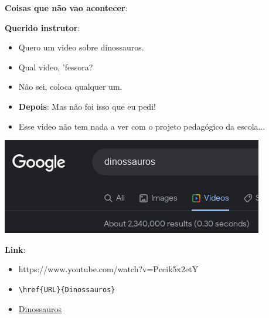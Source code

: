 \begin{multicols}{2}
	\LARGE	 \textbf{Coisas que não vao acontecer}:
	
	\vspace*{10mm}
	\Large \textbf{Querido instrutor}:
	\large
	\begin{itemize}
		\item Quero um video sobre \nobreak dinossauros.
		
		\item Qual video, 'fessora?
		
		\item Não sei, coloca qualquer um.
		
		\item \textbf{Depois}: Mas não foi isso que eu pedi!
		
		\item Esse video não tem nada a ver com o projeto pedagógico da escola...
		
	\end{itemize}
	\vfill\null
	\columnbreak
	
	\begin{center}
		\includegraphics[width=\linewidth]{./IMG-GIT/dinossauros.png}
	\end{center}
	
	\textbf{Link}:
	\large
	\begin{itemize}
		\item https://www.youtube.com/watch?v=Pccik5x2etY
		\item \verb|\href{URL}{Dinossauros}|
		\item \href{https://www.youtube.com/watch?v=Pccik5x2etY}{Dinossauros}
	\end{itemize}
	
	
	\vfill\null
	\columnbreak
	

\end{multicols}
